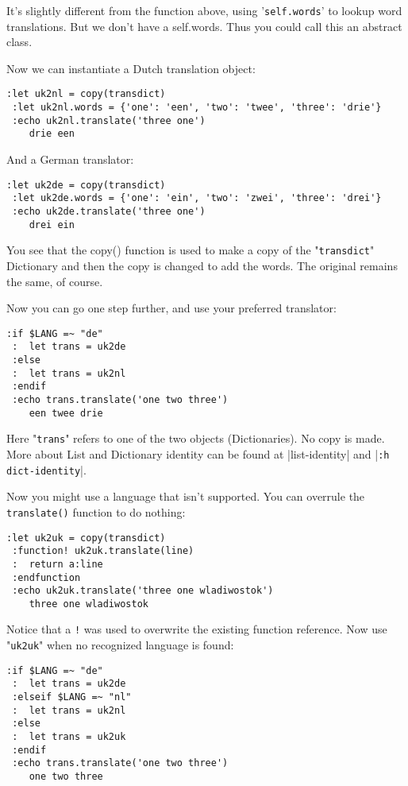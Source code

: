 It's slightly different from the function above, using '\verb!self.words!' to lookup word translations.
But we don't have a self.words.
Thus you could call this an abstract class.

Now we can instantiate a Dutch translation object:

\begin{Verbatim}[samepage=true]
 :let uk2nl = copy(transdict)
 :let uk2nl.words = {'one': 'een', 'two': 'twee', 'three': 'drie'}
 :echo uk2nl.translate('three one')
    drie een
\end{Verbatim}

And a German translator:

\begin{Verbatim}[samepage=true]
 :let uk2de = copy(transdict)
 :let uk2de.words = {'one': 'ein', 'two': 'zwei', 'three': 'drei'}
 :echo uk2de.translate('three one')
    drei ein
\end{Verbatim}

You see that the copy() function is used to make a copy of the "\verb!transdict!" Dictionary and then the copy is changed to add the words.
The original remains the same, of course.

Now you can go one step further, and use your preferred translator:

\begin{Verbatim}[samepage=true]
 :if $LANG =~ "de"
 :  let trans = uk2de
 :else
 :  let trans = uk2nl
 :endif
 :echo trans.translate('one two three')
    een twee drie
\end{Verbatim}

Here "\verb!trans!" refers to one of the two objects (Dictionaries).
No copy is made.
More about List and Dictionary identity can be found at |list-identity| and |\verb!:h dict-identity!|.

Now you might use a language that isn't supported.
You can overrule the \verb!translate()! function to do nothing:

\begin{Verbatim}[samepage=true]
 :let uk2uk = copy(transdict)
 :function! uk2uk.translate(line)
 :  return a:line
 :endfunction
 :echo uk2uk.translate('three one wladiwostok')
    three one wladiwostok
\end{Verbatim}

Notice that a \verb:!: was used to overwrite the existing function reference.
Now use "\verb!uk2uk!" when no recognized language is found:

\begin{Verbatim}[samepage=true]
 :if $LANG =~ "de"
 :  let trans = uk2de
 :elseif $LANG =~ "nl"
 :  let trans = uk2nl
 :else
 :  let trans = uk2uk
 :endif
 :echo trans.translate('one two three')
    one two three
\end{Verbatim}

